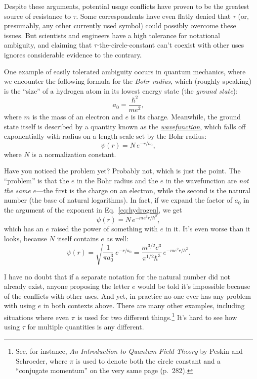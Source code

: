 Despite these arguments, potential usage conflicts have proven to be the greatest source of resistance to $\tau$. Some correspondents have even flatly denied that $\tau$ (or, presumably, any other currently used symbol) could possibly overcome these issues. But scientists and engineers have a high tolerance for notational ambiguity, and claiming that $\tau$-the-circle-constant can't coexist with other uses ignores considerable evidence to the contrary.

One example of easily tolerated ambiguity occurs in quantum mechanics, where we encounter the following formula for the \emph{Bohr radius}, which (roughly speaking) is the ``size'' of a hydrogen atom in its lowest energy state (the \emph{ground state}):
\[
a_0 = \frac{\hbar^2}{m e^2},
\]
where $m$ is the mass of an electron and $e$ is its charge. Meanwhile, the ground state itself is described by a quantity known as the \href{https://en.wikipedia.org/wiki/Wave_function}{\emph{wavefunction}}, which falls off exponentially with radius on a length scale set by the Bohr radius:
\begin{equation}
\label{eq:hydrogen}
\psi(r) = N\,e^{-r/a_0},
\end{equation}
where $N$ is a normalization constant.

Have you noticed the problem yet? Probably not, which is just the point. The ``problem'' is that the $e$ in the Bohr radius and the $e$ in the wavefunction are \emph{not the same $e$}---the first is the charge on an electron, while the second is the natural number (the base of natural logarithms). In fact, if we expand the factor of $a_0$ in the argument of the exponent in Eq.~\eqref{eq:hydrogen}, we get
\[
\psi(r) = N\,e^{-m e^2 r/\hbar^2},
\]
which has an $e$ raised the power of something with $e$ in it. It's even worse than it looks, because $N$ itself contains $e$ as well:
\[
\psi(r) = \sqrt{\frac{1}{\pi a_0^3}}\,e^{-r/a_0} =
\frac{m^{3/2} e^3}{\pi^{1/2} \hbar^3}\,e^{-m e^2 r/\hbar^2}.
\]

I have no doubt that if a separate notation for the natural number did not already exist, anyone proposing the letter $e$ would be told it's impossible because of the conflicts with other uses. And yet, in practice no one ever has any problem with using $e$ in both contexts above.
There are many other examples, including situations where even $\pi$ is used for two different things.\footnote{See, for instance, \emph{An Introduction to Quantum Field Theory} by Peskin and Schroeder, where $\pi$ is used to denote both the circle constant and a ``conjugate momentum'' on the very same page (p.~282).} It's hard to see how using $\tau$ for multiple quantities is any different.

